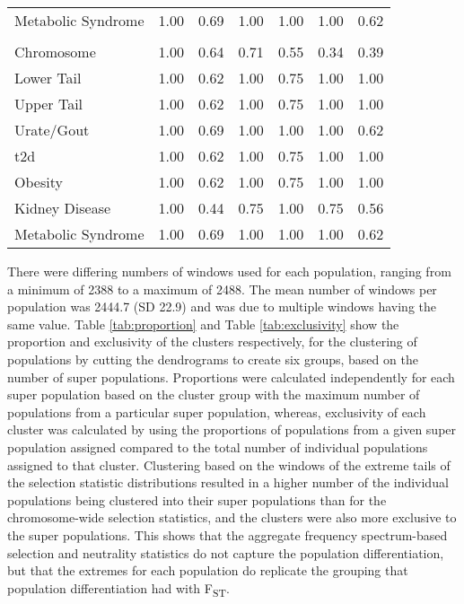 \documentclass[twoside,openright]{report}
\begin{document}
\begin{table}
\begin{tabular}[t]{lllllll}
\hspace{1em}Metabolic Syndrome & 1.00 & 0.69 & 1.00 & 1.00 & 1.00 & \vphantom{1} 0.62\\
\addlinespace[0.3em]
\multicolumn{7}{l}{\textbf{Zeng's E}}\\
\hspace{1em}Chromosome & 1.00 & 0.64 & 0.71 & 0.55 & 0.34 & 0.39\\
\hspace{1em}Lower Tail & 1.00 & 0.62 & 1.00 & 0.75 & 1.00 & 1.00\\
\hspace{1em}Upper Tail & 1.00 & 0.62 & 1.00 & 0.75 & 1.00 & 1.00\\
\hspace{1em}Urate/Gout & 1.00 & 0.69 & 1.00 & 1.00 & 1.00 & 0.62\\
\hspace{1em}\Gls{t2d} & 1.00 & 0.62 & 1.00 & 0.75 & 1.00 & 1.00\\
\hspace{1em}Obesity & 1.00 & 0.62 & 1.00 & 0.75 & 1.00 & 1.00\\
\hspace{1em}Kidney Disease & 1.00 & 0.44 & 0.75 & 1.00 & 0.75 & 0.56\\
\hspace{1em}Metabolic Syndrome & 1.00 & 0.69 & 1.00 & 1.00 & 1.00 & 0.62\\
\bottomrule
\end{tabular}
\end{table}

There were differing numbers of windows used for each population,
ranging from a minimum of 2388 to a maximum of 2488. The mean number of
windows per population was 2444.7 (SD 22.9) and was due to multiple
windows having the same value. Table \ref{tab:proportion} and Table
\ref{tab:exclusivity} show the proportion and exclusivity of the
clusters respectively, for the clustering of populations by cutting the
dendrograms to create six groups, based on the number of super
populations. Proportions were calculated independently for each super
population based on the cluster group with the maximum number of
populations from a particular super population, whereas, exclusivity of
each cluster was calculated by using the proportions of populations from
a given super population assigned compared to the total number of
individual populations assigned to that cluster. Clustering based on the
windows of the extreme tails of the selection statistic distributions
resulted in a higher number of the individual populations being
clustered into their super populations than for the chromosome-wide
selection statistics, and the clusters were also more exclusive to the
super populations. This shows that the aggregate frequency
spectrum-based selection and neutrality statistics do not capture the
population differentiation, but that the extremes for each population do
replicate the grouping that population differentiation had with
F\textsubscript{ST}.
\end{document}
